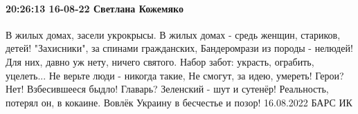
\paragraph{20:26:13 16-08-22 Светлана Кожемяко}

\obeycr
В жилых домах, засели укрокрысы.
В жилых домах - средь женщин, стариков, детей!
"Захисники", за спинами гражданских,
Бандеромрази из породы - нелюдей!
Для них, давно уж нету, ничего святого.
Набор забот: украсть, ограбить, уцелеть...
Не верьте люди - никогда такие,
Не смогут, за идею, умереть!
Герои? Нет! Взбесившееся быдло!
Главарь? Зеленский - шут и сутенёр!
Реальность, потерял он, в кокаине.
Вовлёк Украину в бесчестье и позор!
16.08.2022 БАРС ИК
\restorecr

